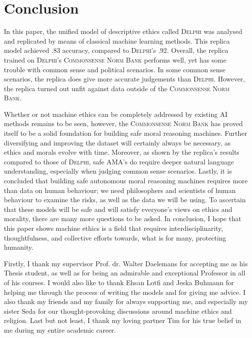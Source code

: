 \documentclass[final]{clv3} %
\begin{document}
\section{Conclusion}

In this paper, the unified model of descriptive ethics called \textsc{Delphi} was analysed and replicated by means of classical machine learning methods. This replica model achieved .83 accuracy, compared to \textsc{Delphi}’s .92. Overall, the replica trained on \textsc{Delphi}’s \textsc{Commonsense Norm Bank} performs well, yet has some trouble with common sense and political scenarios. In some common sense scenarios, the replica does give more accurate judgements than \textsc{Delphi}. However, the replica turned out unfit against data outside of the \textsc{Commonsense Norm Bank}.

Whether or not machine ethics can be completely addressed by existing AI methods remains to be seen, however, the \textsc{Commonsense Norm Bank} has proved itself to be a solid foundation for building safe moral reasoning machines. Further diversifying and improving the dataset will certainly always be necessary, as ethics and morals evolve with time. Moreover, as shown by the replica’s results compared to those of \textsc{Delphi}, safe AMA’s do require deeper natural language understanding, especially when judging common sense scenarios. Lastly, it is concluded that building safe autonomous moral reasoning machines requires more than data on human behaviour; we need philosophers and scientists of human behaviour to examine the risks, as well as the data we will be using. To ascertain that these models will be safe and will satisfy everyone’s views on ethics and morality, there are many more questions to be asked. In conclusion, I hope that this paper shows machine ethics is a field that requires interdisciplinarity, thoughtfulness, and collective efforts towards, what is for many, protecting humanity.

\clearpage

\begin{acknowledgments}
Firstly, I thank my supervisor Prof. dr. Walter Daelemans for accepting me as his Thesis student, as well as for being an admirable and exceptional Professor in all of his courses. I would also like to thank Ehsan Lotfi and Jeska Buhmann for helping me through the process of writing the models and for giving me advice. I also thank my friends and my family for always supporting me, and especially my sister Seda for our thought-provoking discussions around machine ethics and religion. Last but not least, I thank my loving partner Tim for his true belief in me during my entire academic career. 
\end{acknowledgments}
\end{document}
